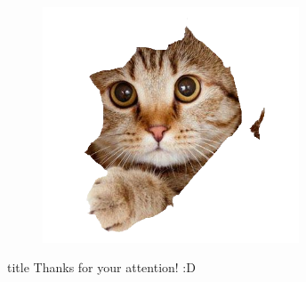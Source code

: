 \documentclass[13pt,aspectratio=169]{beamer}
\begin{document}
\begin{frame}
  \vskip 0.2in
	\begin{figure}[h]
		\centering
		\includegraphics[height=7cm]{imgs/cat.png}
	\end{figure}
\end{frame}

\begin{frame}
  \vfill
  \centering
  \begin{beamercolorbox}[sep=8pt,center,shadow=true,rounded=true]{title}
    Thanks for your attention! :D\par%
  \end{beamercolorbox}
  \vfill
\end{frame}
\end{document}
